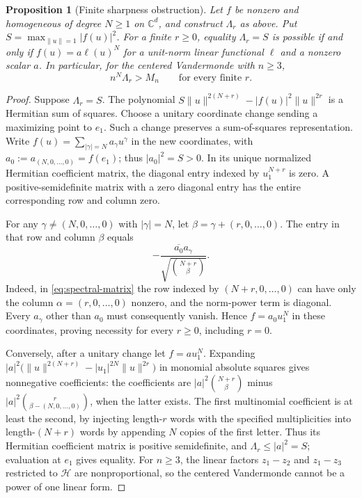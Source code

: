 \documentclass[11pt]{article}
\newtheorem{proposition}[theorem]{Proposition}
\theoremstyle{remark}
\newcommand{\C}{\mathbb C}
\numberwithin{equation}{section}
\begin{document}
\begin{proposition}[Finite sharpness obstruction]\label{prop:spectral-no-finite-sharpness}
Let $f$ be nonzero and homogeneous of degree $N\ge1$ on $\C^d$, and
construct $\Lambda_r$ as above. Put
$S=\max_{\|u\|=1}|f(u)|^2$. For a finite $r\ge0$, equality
$\Lambda_r=S$ is possible if and only if
$f(u)=a\ell(u)^N$ for a unit-norm linear functional $\ell$ and
a nonzero scalar $a$. In particular, for the centered Vandermonde
with $n\ge3$,
\begin{equation}\label{eq:spectral-strictness}
 n^N\Lambda_r>M_n\qquad\text{for every finite }r.
\end{equation}
\end{proposition}
\begin{proof}
Suppose $\Lambda_r=S$. The polynomial
$S\|u\|^{2(N+r)}-|f(u)|^2\|u\|^{2r}$ is a Hermitian sum of squares.
Choose a unitary coordinate change sending a maximizing point to
$e_1$. Such a change preserves a sum-of-squares representation.
Write $f(u)=\sum_{|\gamma|=N}a_\gamma u^\gamma$ in the new
coordinates, with $a_0:=a_{(N,0,\ldots,0)}=f(e_1)$; thus
$|a_0|^2=S>0$. In its unique normalized Hermitian coefficient
matrix, the diagonal entry indexed by $u_1^{N+r}$ is zero.
A positive-semidefinite matrix with a zero diagonal entry has the
entire corresponding row and column zero.

For any $\gamma\ne(N,0,\ldots,0)$ with $|\gamma|=N$, let
$\beta=\gamma+(r,0,\ldots,0)$. The entry in that row and column
$\beta$ equals
\[
 -\frac{\overline{a_0}a_\gamma}{\sqrt{\binom{N+r}\beta}}.
\]
Indeed, in \eqref{eq:spectral-matrix} the row indexed by
$(N+r,0,\ldots,0)$ can have only the column
$\alpha=(r,0,\ldots,0)$ nonzero, and the norm-power term is diagonal.
Every $a_\gamma$ other than $a_0$ must consequently vanish. Hence
$f=a_0u_1^N$ in these coordinates, proving necessity for every
$r\ge0$, including $r=0$.

Conversely, after a unitary change let $f=a u_1^N$. Expanding
$|a|^2\big(\|u\|^{2(N+r)}-|u_1|^{2N}\|u\|^{2r}\big)$ in
monomial absolute squares gives nonnegative coefficients: the
coefficients are $|a|^2\binom{N+r}\beta$ minus
$|a|^2\binom r{\beta-(N,0,\ldots,0)}$, when the latter exists.
The first multinomial coefficient is at least the second, by
injecting length-$r$ words with the specified multiplicities into
length-$(N+r)$ words by appending $N$ copies of the first letter.
Thus its Hermitian coefficient matrix is positive semidefinite,
and $\Lambda_r\le |a|^2=S$; evaluation at $e_1$ gives equality.
For $n\ge3$, the linear factors $z_1-z_2$ and $z_1-z_3$ restricted
to $\mathcal H$ are nonproportional, so the centered Vandermonde
cannot be a power of one linear form.
\end{proof}
\end{document}
